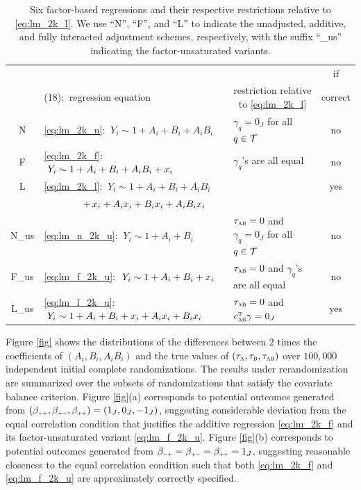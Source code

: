 \documentclass[11pt]{article}
\theoremstyle{definition}
\begin{document}
\begin{table}[t]
\caption{\label{tb:sim} Six factor-based regressions and their respective restrictions relative to \eqref{eq:lm_2k_l}. We use ``N'', ``F'', and ``L'' to indicate the unadjusted, additive, and fully interacted adjustment schemes, respectively, with the suffix ``\_us'' indicating the factor-unsaturated variants. }
\begin{center}
\begin{tabular}{|c|l|l|c|}\hline
&&& if \\
& {\color{white}(18):$ \ $} regression equation & \multicolumn{1}{|c|}{restriction relative to  \eqref{eq:lm_2k_l}} & correct \\\hline
N &  \eqref{eq:lm_2k_n}: $\ Y_i \sim 1+A_i +B_i + A_iB_i$ & $\gamma_q = 0_J$ for all $q\in\mathcal{T}$ & no \\\hline
F & \eqref{eq:lm_2k_f}: $ \ Y_i \sim 1+A_i +B_i + A_iB_i + x_i $ &  $\gamma_q$'s are all equal & no \\\hline
L &  \eqref{eq:lm_2k_l}: $ \ Y_i \sim 1+A_i +B_i + A_iB_i  $ && yes\\
  &$\qquad\qquad  + \, x_i +A_ix_i  +B_i x_i  + A_iB_i x_i $&&\\\hline
N\_us &  \eqref{eq:lm_n_2k_u}: $\ Y_i \sim 1+A_i +B_i$ & $\tau_{\textsc{ab}} = 0$ and $\gamma_q = 0_J$ for all $q\in\mathcal{T}$ & no  \\\hline
F\_us &  \eqref{eq:lm_f_2k_u}: $ \ Y_i \sim 1+A_i +B_i +  x_i$ & $\tau_{\textsc{ab}} = 0$ and $\gamma_q$'s are all equal & no \\\hline
L\_us & \eqref{eq:lm_l_2k_u}: $ \ Y_i \sim 1+A_i +B_i +  x_i +A_ix_i  +B_i x_i $ & $\tau_{\textsc{ab}} = 0$ and $c_{\textsc{ab}}^{ \mathrm{\scriptscriptstyle T} } \gamma  = 0_J$ & yes\\
    \hline
  \end{tabular}
\end{center}
\end{table}
%


Figure \ref{fig} shows the distributions of the differences between  2 times the \olss coefficients of $(A_i,B_i,A_iB_i)$ and the true values of $ (\tau_{\textsc{a}},\tau_{\textsc{b}} , \tau_{\textsc{ab}}) $ over $100,000$ independent initial complete randomizations.
The results under rerandomization are summarized over the subsets of randomizations that satisfy the covariate balance criterion.  
Figure \ref{fig}(a) corresponds to  potential outcomes generated from $(\beta_{\mmm\pp}, \beta_{\pp\mmm}, \beta_{\pp\pp})  = (1_J, 0_J, -1_J)$, suggesting considerable deviation from the equal correlation condition that justifies the additive regression \eqref{eq:lm_2k_f} and its factor-unsaturated variant  \eqref{eq:lm_f_2k_u}. 
Figure \ref{fig}(b)  corresponds to potential outcomes generated from $\beta_{\mmm\pp}=\beta_{\pp\mmm}= \beta_{\pp\pp} = 1_J$, suggesting reasonable closeness to the equal correlation condition such that both \eqref{eq:lm_2k_f} and \eqref{eq:lm_f_2k_u} are approximately correctly specified. 
\end{document}
